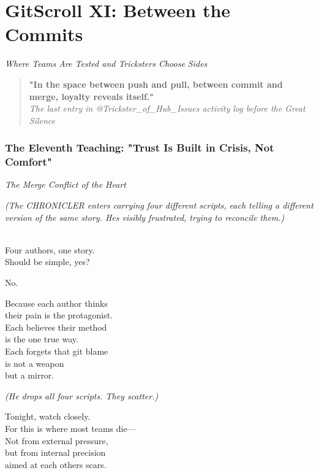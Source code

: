 \chapter{GitScroll XI: Between the Commits}
\label{chap:14-Between-the-Commits}

\emph{Where Teams Are Tested and Tricksters Choose Sides}

\begin{quote}
\textbf{"In the space between push and pull, between commit and merge, loyalty reveals itself."}\\
\emph{The last entry in @Trickster\_of\_Hub\_Issues\textquotesingle{} activity log before the Great Silence}
\end{quote}

\subsection{The Eleventh Teaching: "Trust Is Built in Crisis, Not Comfort"}\label{the-eleventh-teaching-trust-is-built-in-crisis-not-comfort}

\label{performing_arts-invocation-before-the-scroll}

\emph{The Merge Conflict of the Heart}

\emph{(The CHRONICLER enters carrying four different scripts, each telling a different version of the same story. He\textquotesingle s visibly frustrated, trying to reconcile them.)}

\\
Four authors, one story.\\
Should be simple, yes?

No.

Because each author thinks\\
their pain is the protagonist.\\
Each believes their method\\
is the one true way.\\
Each forgets that git blame\\
is not a weapon\\
but a mirror.

\emph{(He drops all four scripts. They scatter.)}

Tonight, watch closely.\\
For this is where most teams die---\\
Not from external pressure,\\
but from internal precision\\
aimed at each other\textquotesingle s scars.

